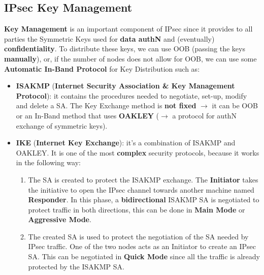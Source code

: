 \subsection{IPsec Key Management}
\textbf{Key Management} is an important component of IPsec since it provides to all parties the
Symmetric Keys used for \textbf{data authN} and (eventually) \textbf{confidentiality}. To distribute these
keys, we can use OOB (passing the keys \textbf{manually}), or, if the number of nodes does not allow
for OOB, we can use some \textbf{Automatic In-Band Protocol} for Key Distribution such as:
\begin{itemize}
    \item \textbf{ISAKMP} (\textbf{Internet Security Association \& Key Management Protocol}):
    it contains the procedures needed to negotiate, set-up, modify and delete a SA.
    The Key Exchange method is \textbf{not fixed} \(\rightarrow \) it can be OOB or an In-Band method that
    uses \textbf{OAKLEY} (\(\rightarrow \) a protocol for authN exchange of symmetric keys).
    \item \textbf{IKE} (\textbf{Internet Key Exchange}): it's a combination of ISAKMP and OAKLEY. It is one of the most \textbf{complex} security
    protocols, because it works in the following way:
    \\
    \begin{minipage}{0.6\textwidth}
    \vspace{0.2cm}
    \begin{enumerate}
        \item The SA is created to protect the ISAKMP exchange. The \textbf{Initiator} takes the initiative to open the IPsec channel towards
        another machine named \textbf{Responder}. In this phase, a \textbf{bidirectional} ISAKMP SA
        is negotiated to protect traffic in both directions, this can be done in \textbf{Main Mode}
        or \textbf{Aggressive Mode}.
        \item The created SA is used to protect the negotiation of the SA needed by IPsec traffic. One of the two nodes acts as an Initiator to create an IPsec SA. This
        can be negotiated in \textbf{Quick Mode} since all the traffic is already protected by the
        ISAKMP SA.
        
    \end{enumerate} 
    \end{minipage} 
    \hspace{0.2cm}
    \begin{minipage}{0.4\textwidth}
       

\end{minipage}
\end{itemize}

